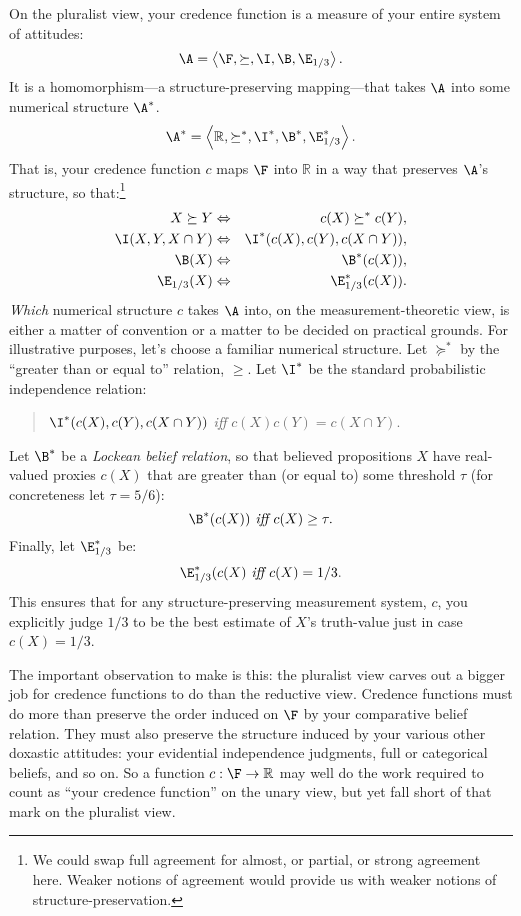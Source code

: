 On the pluralist view, your credence function is a measure of your entire system of attitudes:
$$ \A=\left<\F,\succeq,\I,\B,\E_{1/3}\right>. $$
It is a homomorphism---a structure-preserving mapping---that takes $\A$ into some numerical structure $\A^*$. 
$$ \A^*=\left<\mathbb{R},\succeq^*,\I^*,\B^*,\E_{1/3}^*\right>. $$
That is, your credence function $c$ maps $\F$ into $\mathbb{R}$ in a way that preserves $\A$'s structure, so that:\footnote{We could swap full agreement for almost, or partial, or strong agreement here. Weaker notions of agreement would provide us with weaker notions of structure-preservation.}
\begin{eqnarray*}
X\succeq Y & \Leftrightarrow & c(X)\succeq^* c(Y),\\
\I(X,Y,X\cap Y) & \Leftrightarrow & \I^*(c(X),c(Y),c(X\cap Y)),\\
\B(X) & \Leftrightarrow & \B^*(c(X)),\\
\E_{1/3}(X) & \Leftrightarrow & \E_{1/3}^*(c(X)).
\end{eqnarray*}
\textit{Which} numerical structure $c$ takes $\A$ into, on the measurement-theoretic view, is either a matter of convention or a matter to be decided on practical grounds. For illustrative purposes, let's choose a familiar numerical structure. Let $\succeq^*$ by the ``greater than or equal to'' relation, $\geq$. Let $\I^*$ be the standard probabilistic independence relation:
\begin{quote}\centering
$\I^*(c(X),c(Y),c(X\cap Y))$ \hspace{.3em}\textit{iff}\hspace{.2em} $c(X)c(Y)=c(X\cap Y)$.
\end{quote}
Let $\B^*$ be a \emph{Lockean belief relation}, so that believed propositions $X$ have real-valued proxies $c(X)$ that are greater than (or equal to) some threshold $\tau$ (for concreteness let $\tau=5/6$):
$$ \B^*(c(X)) \textit{ iff } c(X)\geq\tau. $$
Finally, let $\E^*_{1/3}$ be:
$$ \E_{1/3}^*(c(X) \textit{ iff } c(X)=1/3. $$
This ensures that for any structure-preserving measurement system, $c$, you explicitly judge $1/3$ to be the best estimate of $X$'s truth-value just in case $c(X)=1/3$.

The important observation to make is this: the pluralist view carves out a bigger job for credence functions to do than the reductive view. Credence functions must do more than preserve the order induced on $\F$ by your comparative belief relation. They must also preserve the structure induced by your various other doxastic attitudes: your evidential independence judgments, full or categorical beliefs, and so on. So a function $c:\F\rightarrow\mathbb{R}$ may well do the work required to count as ``your credence function'' on the unary view, but yet fall short of that mark on the pluralist view.


